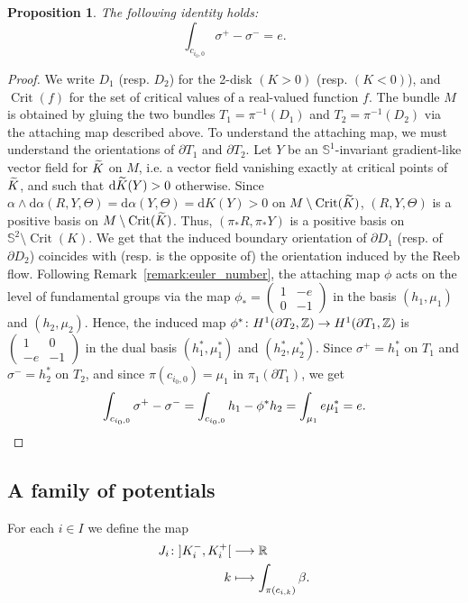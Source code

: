 \documentclass[10pt,a4paper]{amsart}
\DeclareMathOperator{\Crit}{Crit}
\newcommand{\bbS}{\mathbb{S}}
\newcommand{\bbZ}{\mathbb{Z}}
\newcommand{\bbR}{\mathbb{R}}
\newcommand{\rmd}{\mathrm{d}}
\renewcommand*{\to}{\mathchoice{\longrightarrow}{\rightarrow}{\rightarrow}{\rightarrow}}
\let\oldmapsto\mapsto
\renewcommand*{\mapsto}{\mathchoice{\longmapsto}{\oldmapsto}{\oldmapsto}{\oldmapsto}}
\let\oldtilde\tilde
\renewcommand*{\tilde}[1]{\mathchoice{\widetilde{#1}}{\widetilde{#1}}{\oldtilde{#1}}{\oldtilde{#1}}}
\newtheorem{prop}[theo]{Proposition}
\theoremstyle{definition}\newtheorem{defi}[theo]{Definition}
\begin{document}
\begin{prop}\label{prop:equality_euler_number}
The following identity holds:
\[
\int_{c_{i_0,0}} \sigma^+ - \sigma^- = e.
\]
\end{prop}

\begin{proof}
We write $D_1$ (resp. $D_2$) for the 2-disk $(K > 0)$ (resp. $(K<0)$), and $\Crit(f)$ for the set of critical values of a real-valued function $f$. The bundle $M$ is obtained by gluing the two bundles $T_1 = \pi^{-1}(D_1)$ and $T_2 = \pi^{-1}(D_2)$ via the attaching map described above. To understand the attaching map, we must understand the orientations of $\partial T_1$ and $\partial T_2$. Let $Y$ be an $\bbS^1$-invariant gradient-like vector field for $\tilde K$ on $M$, i.e. a vector field vanishing exactly at critical points of $\tilde K$, and such that $\rmd \tilde K(Y) > 0$ otherwise. Since $\alpha \wedge \rmd \alpha (R,Y,\Theta) = \rmd \alpha(Y,\Theta) = \rmd K(Y) > 0$ on $M \setminus \Crit(\tilde K)$, $(R,Y,\Theta)$ is a positive basis on $M \setminus \Crit(\tilde K)$. Thus, $(\pi_* R, \pi_* Y)$ is a positive basis on $\bbS^2 \setminus \Crit(K)$. We get that the induced boundary orientation of $\partial D_1$ (resp. of $\partial D_2$) coincides with (resp. is the opposite of) the orientation induced by the Reeb flow. Following Remark~\ref{remark:euler_number}, the attaching map $\phi$ acts on the level of fundamental groups via the map $\phi_* =
\left(\begin{smallmatrix}
1 & -e\\0 & -1
\end{smallmatrix}\right)$ in the basis $(h_1, \mu_1)$ and $(h_2, \mu_2)$. Hence, the induced map $\phi^* \colon H^1(\partial T_2, \bbZ) \to H^1(\partial T_1, \bbZ)$ is $
\left(\begin{smallmatrix}
1 & 0\\-e & -1
\end{smallmatrix}\right)$ in the dual basis $(h_1^*, \mu_1^*)$ and $(h_2^*, \mu_2^*)$. Since $\sigma^+ = h_1^*$ on $T_1$ and $\sigma^- = h_2^*$ on $T_2$, and since $\pi(c_{i_0,0}) = \mu_1$ in $\pi_1(\partial T_1)$, we get
\[
\int_{c_{i_0,0}} \sigma^+ - \sigma^- = \int_{c_{i_0,0}} h_1 - \phi^*{h_2} = \int_{\mu_1} e \mu_1^* = e.\qedhere
\]
\end{proof}


\subsection{A family of potentials}\label{sub:a_family_of_potentials}
For each $i \in I$ we define the map
\begin{align*}
J_i \colon \mathopen{]}K_i^-, K_i^+\mathclose{[} &\to \bbR \\
 k &\mapsto \int_{\pi(c_{i,k})} \beta.
\end{align*}
\end{document}
